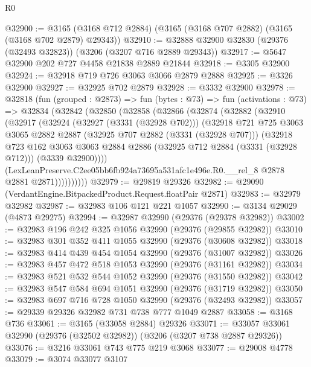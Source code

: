 \begin{lexlean}{R0}
\begin{coremodule}
@32900 := @3165 (@3168 @712 @2884) (@3165 (@3168 @707 @2882) (@3165 (@3168 @702 @2879) @29343))
@32910 := @32888 @32900 @32830 (@29376 (@32493 @32823)) (@3206 (@3207 @716 @2889 @29343))
@32917 := @5647 @32900 @202 @727 @4458 @21838 @2889 @21844
@32918 := @3305 @32900
@32924 := @32918 @719 @726 @3063 @3066 @2879 @2888
@32925 := @3326 @32900
@32927 := @32925 @702 @2879
@32928 := @3332 @32900
@32978 := @32818
    (fun (grouped : @2873) =>
    fun (bytes : @73) =>
    fun (activations : @73) =>
    @32834
      (@32842
        (@32850
          (@32858
            (@32866
              (@32874
                (@32882
                  (@32910
                    (@32917
                      (@32924
                        (@32927 (@3331 (@32928 @702)))
                        (@32918
                          @721
                          @725
                          @3063
                          @3065
                          @2882
                          @2887
                          (@32925 @707 @2882 (@3331 (@32928 @707)))
                          (@32918
                            @723
                            @162
                            @3063
                            @3063
                            @2884
                            @2886
                            (@32925 @712 @2884 (@3331 (@32928 @712)))
                            (@3339 @32900))))
                      (LexLeanPreserve.C2ee05bb6fb924a73695a531afc1e496e.R0.__rel_8
                        @2878
                        @2881
                        @2871))))))))))
@32979 := @29819 @29326
@32982 := @29090 (VerdantEngine.BitpackedProduct.Request.floatPair @2871)
@32983 := @32979 @32982
@32987 := @32983 @106 @121 @221 @1057
@32990 := @3134 @29029 (@4873 @29275)
@32994 := @32987 @32990 (@29376 (@29378 @32982))
@33002 := @32983 @196 @242 @325 @1056 @32990 (@29376 (@29855 @32982))
@33010 := @32983 @301 @352 @411 @1055 @32990 (@29376 (@30608 @32982))
@33018 := @32983 @414 @439 @454 @1054 @32990 (@29376 (@31007 @32982))
@33026 := @32983 @457 @472 @518 @1053 @32990 (@29376 (@31161 @32982))
@33034 := @32983 @521 @532 @544 @1052 @32990 (@29376 (@31550 @32982))
@33042 := @32983 @547 @584 @694 @1051 @32990 (@29376 (@31719 @32982))
@33050 := @32983 @697 @716 @728 @1050 @32990 (@29376 (@32493 @32982))
@33057 := @29339 @29326 @32982 @731 @738 @777 @1049 @2887
@33058 := @3168 @736
@33061 := @3165 (@33058 @2884) @29326
@33071 := @33057 @33061 @32990 (@29376 (@32502 @32982)) (@3206 (@3207 @738 @2887 @29326))
@33076 := @3216 @33061 @743 @775 @219 @3068
@33077 := @29008 @4778
@33079 := @3074 @33077 @3107

\end{coremodule}
\end{lexlean}
